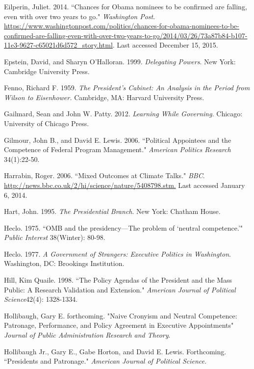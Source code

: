 \documentclass[12pt]{article}
\begin{document}
\noindent \hangindent=0.7cm Eilperin, Juliet. 2014. ``Chances for Obama nominees to be confirmed are falling, even with over two years to go." \textit{Washington Post}. \url{https://www.washingtonpost.com/politics/chances-for-obama-nominees-to-be-confirmed-are-falling-even-with-over-two-years-to-go/2014/03/26/73a87b84-b107-11e3-9627-c65021d6d572_story.html}. Last accessed December 15, 2015. 

\noindent \hangindent=0.7cm Epstein, David, and Sharyn O'Halloran. 1999. \textit{Delegating Powers}. New York: Cambridge University Press. 

\noindent \hangindent=0.7cm Fenno, Richard F. 1959. \textit{The President's Cabinet: An Analysis in the Period from Wilson to Eisenhower.} Cambridge, MA: Harvard University Press.

\noindent \hangindent=0.7cm Gailmard, Sean and John W. Patty. 2012. \textit{Learning While Governing.} Chicago: University of Chicago Press. 

\noindent \hangindent=0.7cm Gilmour, John B., and David E. Lewis. 2006. ``Political Appointees and the Competence of Federal Program Management." \textit{American Politics Research} 34(1):22-50. 

\noindent \hangindent=0.7cm Harrabin, Roger. 2006.  ``Mixed Outcomes at Climate Talks." \textit{BBC}. \url{http://news.bbc.co.uk/2/hi/science/nature/5408798.stm.} Last accessed January 6, 2014.

\noindent \hangindent=0.7cm Hart, John. 1995. \textit{The Presidential Branch}.  New York: Chatham House.

\noindent \hangindent=0.7cm Heclo. 1975. ``OMB and the presidency---The problem of `neutral competence.'" \textit{Public Interest} 38(Winter): 80-98.

\noindent \hangindent=0.7cm Heclo. 1977. \textit{A Government of Strangers: Executive Politics in Washington}. Washington, DC: Brookings Institution.

\noindent \hangindent=0.7cm Hill, Kim Quaile. 1998. ``The Policy Agendas of the President and the Mass Public: A Research Validation and Extension." \textit{American Journal of Political Science}42(4): 1328-1334.

\noindent \hangindent=0.7cm Hollibaugh, Gary E. forthcoming. "Naive Cronyism and Neutral Competence: Patronage, Performance, and Policy Agreement in Executive Appointments" \textit{Journal of Public Administration Research and Theory}. 

\noindent \hangindent=0.7cm Hollibaugh Jr., Gary E., Gabe Horton, and David E. Lewis. Forthcoming. ``Presidents and Patronage." \textit{American Journal of Political Science.}
\end{document}
